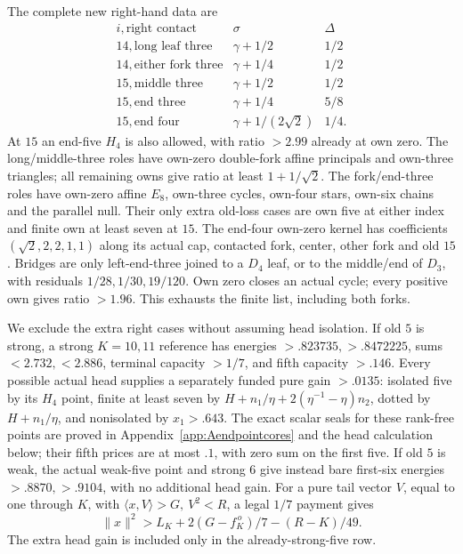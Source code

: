 \documentclass[11pt]{article}
\theoremstyle{definition}
\theoremstyle{remark}
\newcommand{\ip}[2]{\langle #1,#2\rangle}
\newcommand{\norm}[1]{\lVert #1\rVert}
\begin{document}
The complete new right-hand data are
\[
\begin{array}{c|c|c}
i,\text{right contact}&\sigma&\Delta\\ \hline
14,\text{long leaf three}&\gamma+1/2&1/2\\
14,\text{either fork three}&\gamma+1/4&1/2\\
15,\text{middle three}&\gamma+1/2&1/2\\
15,\text{end three}&\gamma+1/4&5/8\\
15,\text{end four}&\gamma+1/(2\sqrt2)&1/4 .
\end{array}
\]
At \(15\) an end-five \(H_4\) is also allowed, with ratio \(>2.99\)
already at own zero.
The long/middle-three roles have own-zero double-fork affine
principals and own-three triangles; all remaining owns give ratio
at least \(1+1/\sqrt2\).
The fork/end-three roles have own-zero affine \(E_8\), own-three
cycles, own-four stars, own-six chains and the parallel null.
Their only extra old-loss cases are own five at either index and
finite own at least seven at \(15\).
The end-four own-zero kernel has coefficients
\((\sqrt2,2,2,1,1)\) along its actual cap, contacted fork,
center, other fork and old \(15\).
Bridges are only left-end-three joined to a \(D_4\) leaf, or
to the middle/end of \(D_3\), with residuals
\(1/28,1/30,19/120\). Own zero closes an actual cycle;
every positive own gives ratio \(>1.96\).
This exhausts the finite list, including both forks.

We exclude the extra right cases without assuming head isolation.
If old \(5\) is strong, a strong \(K=10,11\) reference has
energies \(>.823735,>.8472225\), sums \(<2.732,<2.886\),
terminal capacity \(>1/7\), and fifth capacity \(>.146\).
Every possible actual head supplies a separately funded pure gain
\(>.0135\): isolated five by its \(H_4\) point, finite at least seven
by \(H+n_1/\eta+2(\eta^{-1}-\eta)n_2\), dotted by \(H+n_1/\eta\),
and nonisolated by \(x_1>.643\).
The exact scalar seals for these rank-free points are proved in
Appendix~\ref{app:Aendpointcores} and the head calculation below;
their fifth prices are at most \(.1\), with zero sum on the first five.
If old \(5\) is weak, the actual weak-five point and strong \(6\)
give instead bare first-six energies \(>.8870,>.9104\),
with no additional head gain.
For a pure tail vector \(V\), equal to one through \(K\), with
\(\ip xV>G,\ V^2<R\), a legal \(1/7\) payment gives
\[
 \norm x^2>L_K+2(G-f_K^{\,o})/7-(R-K)/49.
\]
The extra head gain is included only in the already-strong-five row.
\end{document}
